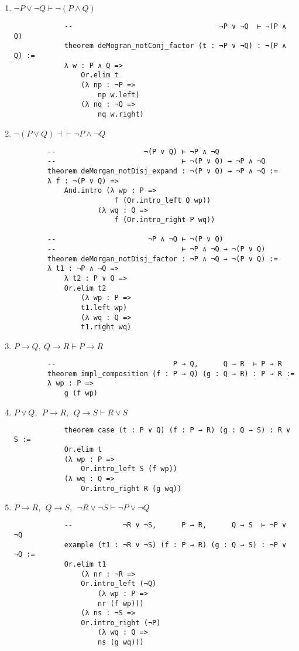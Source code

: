 \documentclass[11pt]{report}
\begin{document}
\begin{enumerate}
\begin{enumerate}
		\newpage
		\item $\lnot P\lor \lnot Q \vdash \lnot( P\land  Q)$
		
			\begin{lstlisting}
			--                                   ¬P ∨ ¬Q  ⊢ ¬(P ∧ Q)
			theorem deMogran_notConj_factor (t : ¬P ∨ ¬Q) : ¬(P ∧ Q) :=
			λ w : P ∧ Q =>
				Or.elim t
				(λ np : ¬P =>
					np w.left)
				(λ nq : ¬Q =>
					nq w.right)
			\end{lstlisting}

		\newpage
		\item $\lnot( P\lor  Q) \dashv\vdash \lnot  P\land \lnot  Q$
		
		\begin{lstlisting}
		--                     ¬(P ∨ Q) ⊢ ¬P ∧ ¬Q
		--                              ⊢ ¬(P ∨ Q) → ¬P ∧ ¬Q
		theorem deMorgan_notDisj_expand : ¬(P ∨ Q) → ¬P ∧ ¬Q :=
		λ f : ¬(P ∨ Q) =>
			And.intro (λ wp : P =>
						f (Or.intro_left Q wp))
					(λ wq : Q =>
						f (Or.intro_right P wq))
		
		--                      ¬P ∧ ¬Q ⊢ ¬(P ∨ Q)
		--                              ⊢ ¬P ∧ ¬Q → ¬(P ∨ Q)
		theorem deMorgan_notDisj_factor : ¬P ∧ ¬Q → ¬(P ∨ Q) :=
		λ t1 : ¬P ∧ ¬Q =>
			λ t2 : P ∨ Q =>
			Or.elim t2
				(λ wp : P =>
				t1.left wp)
				(λ wq : Q =>
				t1.right wq)
		\end{lstlisting}

		\item $ P\rightarrow  Q, \  Q \rightarrow  R \vdash  P\rightarrow  R $

		\begin{lstlisting}
		--                            P → Q,      Q → R  ⊢ P → R
		theorem impl_composition (f : P → Q) (g : Q → R) : P → R :=
		λ wp : P =>
			g (f wp)
		\end{lstlisting}

		\item $ P\lor  Q,\ \  P\to  R,\ \  Q \to  S \vdash   R \lor  S$
		
			\begin{lstlisting}
			theorem case (t : P ∨ Q) (f : P → R) (g : Q → S) : R ∨ S :=
			Or.elim t
			(λ wp : P =>
				Or.intro_left S (f wp))
			(λ wq : Q =>
				Or.intro_right R (g wq))
			\end{lstlisting}

		\item $ P\to  R,\ \  Q \to  S,\ \ \neg R \lor \neg  S \vdash  \neg P\lor \neg  Q$
		
			\begin{lstlisting}
			--            ¬R ∨ ¬S,      P → R,      Q → S  ⊢ ¬P ∨ ¬Q
			example (t1 : ¬R ∨ ¬S) (f : P → R) (g : Q → S) : ¬P ∨ ¬Q :=
			Or.elim t1
				(λ nr : ¬R =>
				Or.intro_left (¬Q)
					(λ wp : P =>
					nr (f wp)))
				(λ ns : ¬S =>
				Or.intro_right (¬P)
					(λ wq : Q =>
					ns (g wq)))
			\end{lstlisting}


\end{enumerate}
\end{enumerate}
\end{document}
